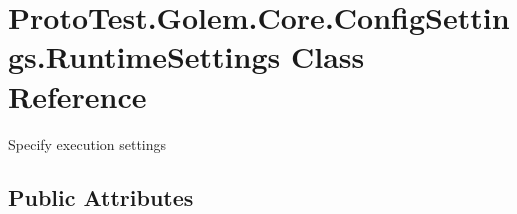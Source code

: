 \hypertarget{class_proto_test_1_1_golem_1_1_core_1_1_config_settings_1_1_runtime_settings}{\section{Proto\-Test.\-Golem.\-Core.\-Config\-Settings.\-Runtime\-Settings Class Reference}
\label{class_proto_test_1_1_golem_1_1_core_1_1_config_settings_1_1_runtime_settings}
}


Specify execution settings  


\subsection*{Public Attributes}
